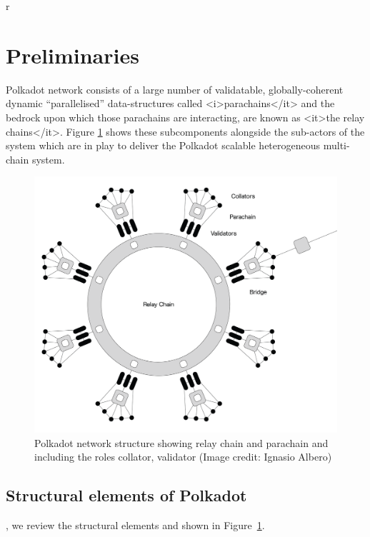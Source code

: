 r\section{Preliminaries}\label{sec:preliminiary}
Polkadot network consists of a large number of validatable, globally-coherent dynamic “parallelised” data-structures called  <i>parachains</it> and the bedrock upon which those parachains are interacting, are known as <it>the relay chains</it>. Figure \ref{fig:roles} shows these subcomponents alongside the sub-actors of the system which are in play to deliver the Polkadot scalable heterogeneous multi-chain system.

\begin{figure}[h]
	\centering
	\includegraphics[width=.7\textwidth]{images/Network@2x.png}
	\caption{Polkadot network structure showing relay chain and parachain and including the roles collator, validator (Image credit: Ignasio Albero)}
	\label{fig:roles}
\end{figure}
\subsection{Structural elements of Polkadot}
, we review the structural elements and  shown in Figure~\ref{fig:roles}.

